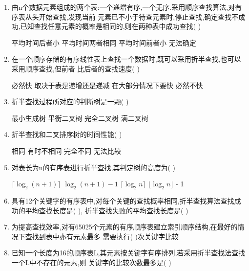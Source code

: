 \documentclass[12pt, a4paper, oneside, UTF8]{ctexbook}
\begin{document}
\begin{enumerate}
    \item 由n个数据元素组成的两个表:一个递增有序,一个无序.采用顺序查找算法,对有序表从头开始查找,发现当前
    元素已不小于待查元素时,停止查找,确定查找不成功,已知查找任意元素的概率是相同的,则在两种表中成功查找(   ) 
    \begin{choices}[2]
        \task 平均时间后者小
        \task 平均时间两者相同
        \task 平均时间前者小
        \task 无法确定
    \end{choices}

    \item 在一个顺序存储的有序线性表上查找一个数据时,既可以采用折半查找,也可以采用顺序查找,但前者
    比后者的查找速度(   ) 
    \begin{choices}[2]
        \task 必然快
        \task 取决于表是递增还是递减
        \task 在大部分情况下要快
        \task 必然不快 
    \end{choices}

    \item 折半查找过程所对应的判断树是一颗(   ) 
    \begin{choices}
        \task 最小生成树
        \task 平衡二叉树
        \task 完全二叉树
        \task 满二叉树
    \end{choices}

    \item 折半查找和二叉排序树的时间性能(   ) 
    \begin{choices}
        \task 相同
        \task 有时不相同
        \task 完全不同
        \task 无法比较
    \end{choices}

    \item 对表长为n的有序表进行折半查找,其判定树的高度为(    ) 
    \begin{choices}
        \task $\lceil\log_{2}{(n+1)}\rceil$
        \task $\log_{2}{(n+1)}-1$
        \task $\lceil\log_{2}{n}\rceil$
        \task $\lfloor\log_2{n}\rfloor$ - 1
    \end{choices}

    \item 具有12个关键字的有序表中,对每个关键的查找概率相同,折半查找算法查找成功的平均查找长度是(   ),
    折半查找失败的平均查找长度是(    ) 

    \item 为提高查找效率,对有65025个元素的有序顺序表建立索引顺序结构,在最好的情况下查找到表中亦有元素最多
    需要执行(   )次关键字比较 

    \item \bl 已知一个长度为16的顺序表L,其元素按关键字有序排列,若采用折半查找法查找一个L中不存在的元素,则
    关键字的比较次数最多是(    ) 



\end{enumerate}
\end{document}
